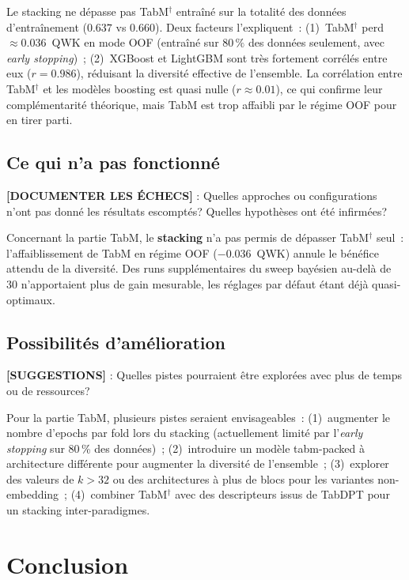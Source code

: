 \documentclass[conference]{IEEEtran}
\begin{document}
Le stacking ne dépasse pas TabM$^\dagger$ entraîné sur la totalité des
données d'entraînement ($0.637$ vs $0.660$). Deux facteurs l'expliquent~:
(1)~TabM$^\dagger$ perd~$\approx 0.036$~QWK en mode OOF (entraîné sur
$80\,\%$ des données seulement, avec \textit{early stopping})~;
(2)~XGBoost et LightGBM sont très fortement corrélés entre eux
($r=0.986$), réduisant la diversité effective de l'ensemble. La corrélation
entre TabM$^\dagger$ et les modèles boosting est quasi nulle ($r\approx0.01$),
ce qui confirme leur complémentarité théorique, mais TabM est trop affaibli
par le régime OOF pour en tirer parti.

\subsection{Ce qui n'a pas fonctionné}

\textbf{[DOCUMENTER LES ÉCHECS]} : Quelles approches ou configurations n'ont pas donné les
résultats escomptés? Quelles hypothèses ont été infirmées?

Concernant la partie TabM, le \textbf{stacking} n'a pas permis de dépasser TabM$^\dagger$
seul~: l'affaiblissement de TabM en régime OOF ($-0.036$~QWK) annule le bénéfice attendu
de la diversité. Des runs supplémentaires du sweep bayésien au-delà de 30 n'apportaient
plus de gain mesurable, les réglages par défaut étant déjà quasi-optimaux.

\subsection{Possibilités d'amélioration}

\textbf{[SUGGESTIONS]} : Quelles pistes pourraient être explorées avec plus de temps ou de
ressources?

Pour la partie TabM, plusieurs pistes seraient envisageables~: (1)~augmenter le nombre
d'epochs par fold lors du stacking (actuellement limité par l'\textit{early stopping} sur
80\,\% des données)~; (2)~introduire un modèle tabm-packed à architecture différente pour
augmenter la diversité de l'ensemble~; (3)~explorer des valeurs de $k>32$ ou des architectures
à plus de blocs pour les variantes non-embedding~; (4)~combiner TabM$^\dagger$ avec des
descripteurs issus de TabDPT pour un stacking inter-paradigmes.

\section{Conclusion}
\end{document}
